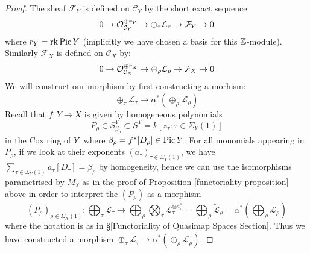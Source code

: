 \begin{proof}
The sheaf $\mathcal{F}_Y$ is defined on $\mathcal{C}_Y$ by the short exact sequence
\begin{equation*} 0 \rightarrow \mathcal{O}_{\mathcal{C}_Y}^{\oplus r_Y} \rightarrow \oplus_{\tau} \mathcal{L}_\tau \rightarrow \mathcal{F}_Y \rightarrow 0 \end{equation*}
where $r_Y = \operatorname{rk} \operatorname{Pic} Y$ (implicitly we have chosen a basis for this $\mathbb{Z}$-module). Similarly $\mathcal{F}_{X}$ is defined on $\mathcal{C}_{X}$ by:
\begin{equation*} 0 \rightarrow \mathcal{O}_{\mathcal{C}_{X}}^{\oplus r_X} \rightarrow \oplus_{\rho} \mathcal{L}_\rho \rightarrow \mathcal{F}_{X} \rightarrow 0 \end{equation*}
We will construct our morphism by first constructing a morhism:
\begin{equation*} \oplus_{\tau} \mathcal{L}_\tau \to \alpha^* (\oplus_{\rho} \mathcal{L}_\rho) \end{equation*}
Recall that $f\colon Y\to X$ is given by homogeneous polynomials
\begin{equation*} P_\rho \in S^Y_{\beta_\rho} \subset S^Y = k[z_\tau : \tau \in \Sigma_Y(1)] \end{equation*}
in the Cox ring of $Y$, where $\beta_{\rho}=f^*[D_\rho] \in \operatorname{Pic} Y$. For all monomials appearing in $P_\rho$, if we look at their exponents $(a_{\tau})_{\tau\in\Sigma_Y(1)}$, we have $\sum_{\tau\in\Sigma_Y(1)}a_\tau[D_\tau]=\beta_\rho$ by homogeneity, hence we can use the isomorphisms parametrised by $M_Y$ as in the proof of Proposition \ref{functoriality proposition} above in order to interpret the $(P_\rho)$ as a morphism
\begin{equation*} (P_\rho)_{\rho\in\Sigma_X(1)}\colon \bigoplus_{\tau} \mathcal{L}_{\tau} \to \bigoplus_{\rho} \bigotimes_{\tau} \mathcal{L}_\tau^{\otimes a_\tau^\rho} = \bigoplus_{\rho} \tilde{\mathcal{L}}_\rho = \alpha^* \left( \bigoplus_{\rho} \mathcal{L}_\rho \right) 
\end{equation*}
where the notation is as in \S \ref{Functoriality of Quasimap Spaces Section}. Thus we have constructed a morphism $\oplus_{\tau} \mathcal{L}_\tau \to \alpha^* (\oplus_{\rho} \mathcal{L}_\rho)$.


\end{proof}
